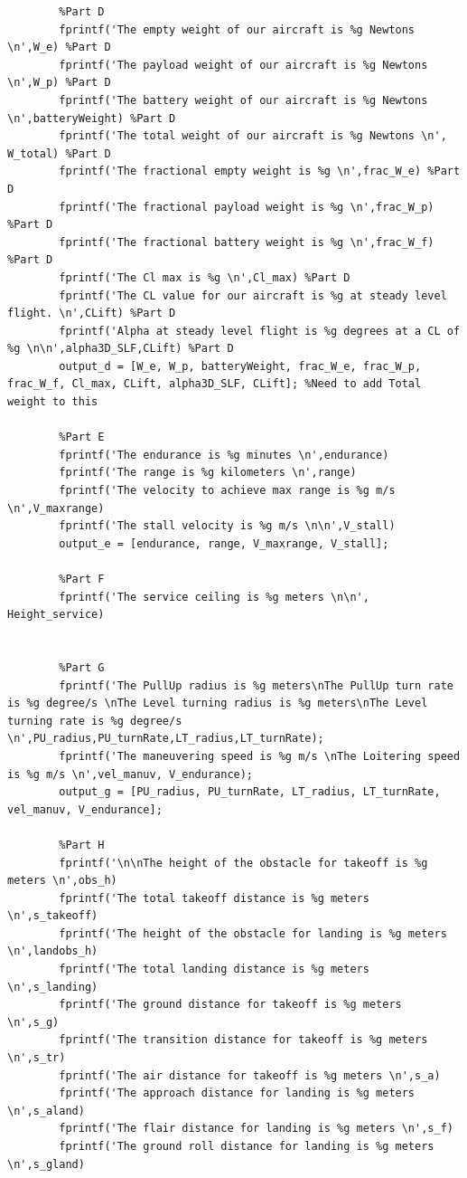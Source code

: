 \documentclass[12pt,A4paper]{article}
\begin{document}
\begin{lstlisting}
		%Part D
		fprintf('The empty weight of our aircraft is %g Newtons \n',W_e) %Part D
		fprintf('The payload weight of our aircraft is %g Newtons \n',W_p) %Part D
		fprintf('The battery weight of our aircraft is %g Newtons \n',batteryWeight) %Part D
		fprintf('The total weight of our aircraft is %g Newtons \n', W_total) %Part D
		fprintf('The fractional empty weight is %g \n',frac_W_e) %Part D
		fprintf('The fractional payload weight is %g \n',frac_W_p) %Part D
		fprintf('The fractional battery weight is %g \n',frac_W_f) %Part D
		fprintf('The Cl max is %g \n',Cl_max) %Part D
		fprintf('The CL value for our aircraft is %g at steady level flight. \n',CLift) %Part D
		fprintf('Alpha at steady level flight is %g degrees at a CL of %g \n\n',alpha3D_SLF,CLift) %Part D
		output_d = [W_e, W_p, batteryWeight, frac_W_e, frac_W_p, frac_W_f, Cl_max, CLift, alpha3D_SLF, CLift]; %Need to add Total weight to this
		
		%Part E
		fprintf('The endurance is %g minutes \n',endurance)
		fprintf('The range is %g kilometers \n',range)
		fprintf('The velocity to achieve max range is %g m/s \n',V_maxrange)
		fprintf('The stall velocity is %g m/s \n\n',V_stall)
		output_e = [endurance, range, V_maxrange, V_stall];
		
		%Part F
		fprintf('The service ceiling is %g meters \n\n', Height_service)
		
		
		%Part G
		fprintf('The PullUp radius is %g meters\nThe PullUp turn rate is %g degree/s \nThe Level turning radius is %g meters\nThe Level turning rate is %g degree/s \n',PU_radius,PU_turnRate,LT_radius,LT_turnRate);
		fprintf('The maneuvering speed is %g m/s \nThe Loitering speed is %g m/s \n',vel_manuv, V_endurance);
		output_g = [PU_radius, PU_turnRate, LT_radius, LT_turnRate, vel_manuv, V_endurance];
		
		%Part H
		fprintf('\n\nThe height of the obstacle for takeoff is %g meters \n',obs_h)
		fprintf('The total takeoff distance is %g meters \n',s_takeoff)
		fprintf('The height of the obstacle for landing is %g meters \n',landobs_h)
		fprintf('The total landing distance is %g meters \n',s_landing)
		fprintf('The ground distance for takeoff is %g meters  \n',s_g)
		fprintf('The transition distance for takeoff is %g meters \n',s_tr)
		fprintf('The air distance for takeoff is %g meters \n',s_a)
		fprintf('The approach distance for landing is %g meters \n',s_aland)
		fprintf('The flair distance for landing is %g meters \n',s_f)
		fprintf('The ground roll distance for landing is %g meters \n',s_gland)
		

\end{lstlisting}
\end{document}
